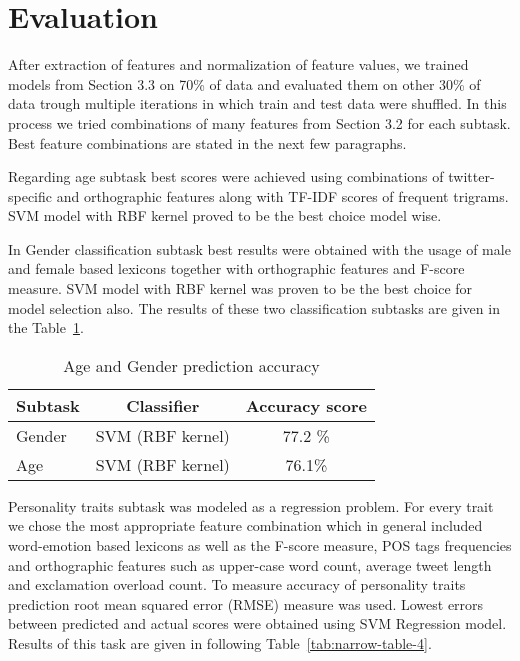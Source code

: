 \documentclass[10pt, a4paper]{article}
\begin{document}
\section{Evaluation}
After extraction of features and normalization of feature values, we trained models from Section 3.3  on 70\% of data and evaluated them on other 30\% of data trough multiple iterations in which train and test data were shuffled. In this process we tried combinations of many features from Section 3.2 for each subtask. Best feature combinations are stated in the next few paragraphs. 
\par\vspace{1mm}
Regarding age subtask best scores were achieved using combinations of twitter-specific  and orthographic features along with TF-IDF scores of frequent trigrams. SVM model with RBF kernel proved to be the best choice model wise.
\par
In Gender classification subtask best results were obtained with the usage of male and female based lexicons together with orthographic features and F-score measure. SVM model with RBF kernel was proven to be the best choice for model selection also. The results of these two classification subtasks are given in the Table~\ref{tab:narrow-table-3}.
\begin{table}[h]
\caption{Age and Gender prediction accuracy}
\label{tab:narrow-table-3}
\vspace{-6mm}
\begin{center}
\begin{tabular}{lcc}
\toprule
Subtask & Classifier & Accuracy score\\
\midrule
 Gender & SVM (RBF kernel) & 77.2 \% \\
 Age & SVM (RBF kernel) & 76.1\%\\
\bottomrule
\end{tabular}
\end{center}
\end{table}
\par\vspace{-5mm}
Personality traits subtask was modeled as a regression problem. For every trait we chose the most appropriate feature combination which in general included word-emotion based lexicons as well as the F-score measure, POS tags frequencies and orthographic features such as upper-case word count, average tweet length and exclamation overload count. To measure accuracy of personality traits prediction root mean squared error (RMSE) measure was used. Lowest errors between predicted and actual scores were obtained using SVM Regression model. Results of this task are given in following Table~\ref{tab:narrow-table-4}.
\end{document}
